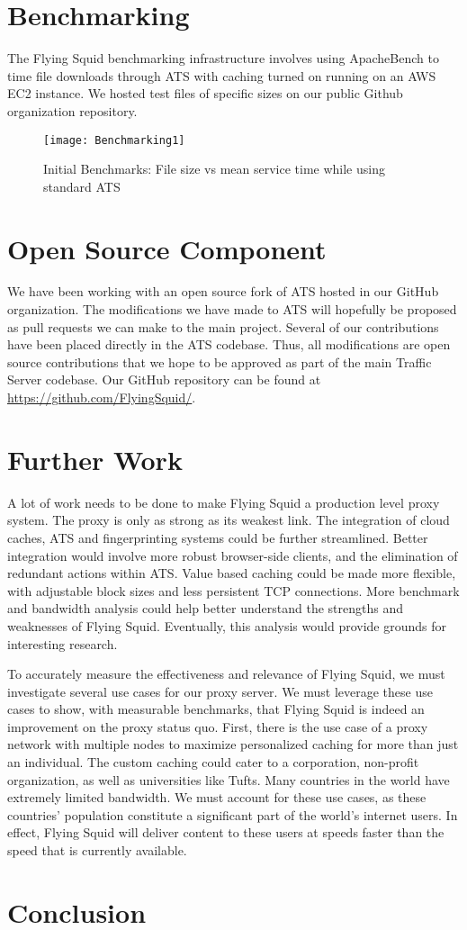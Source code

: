 \section{Benchmarking}

The Flying Squid  benchmarking infrastructure involves using ApacheBench to time file downloads through ATS with caching turned on running on an AWS EC2 instance. We hosted test files of specific sizes on our public Github organization repository.

\begin{figure}[H] \centering
\texttt{[image: Benchmarking1]}
\caption{Initial Benchmarks: File size vs mean service time while using standard ATS}
\end{figure}

\section{Open Source Component}

We have been working with an open source fork of ATS hosted in our GitHub organization. The modifications we have made to ATS will hopefully be proposed as pull requests we can make to the main project. Several of our contributions have been placed directly in the ATS codebase. Thus, all modifications are open source contributions that we hope to be approved as part of the main Traffic Server codebase. Our GitHub repository can be found at \url{https://github.com/FlyingSquid/}.

\section{Further Work}

A lot of work needs to be done to make Flying Squid a production level proxy system. The proxy is only as strong as its weakest link. The integration of cloud caches, ATS and fingerprinting systems could be further streamlined. Better integration would involve more robust browser-side clients, and the elimination of redundant actions within ATS. Value based caching could be made more flexible, with adjustable block sizes and less persistent TCP connections. More benchmark and bandwidth analysis could help better understand the strengths and weaknesses of Flying Squid. Eventually, this analysis would provide grounds for interesting research.

To accurately measure the effectiveness and relevance of Flying Squid, we must investigate several use cases for our proxy server. We must leverage these use cases to show, with measurable benchmarks, that Flying Squid is indeed an improvement on the proxy status quo. First, there is the use case of a proxy network with multiple nodes to maximize personalized caching for more than just an individual. The custom caching could cater to a corporation, non-profit organization, as well as universities like Tufts. 
Many countries in the world have extremely limited bandwidth. We must account for these use cases, as these countries’ population constitute a significant part of the world’s internet users. In effect, Flying Squid will deliver content to these users at speeds faster than the speed that is currently available.


\section{Conclusion}






